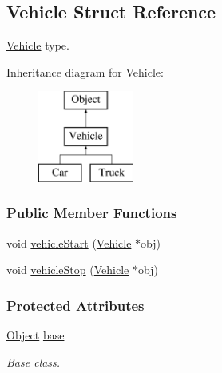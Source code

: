 \hypertarget{struct_vehicle}{}\subsection{Vehicle Struct Reference}
\label{struct_vehicle}


\mbox{\hyperlink{struct_vehicle}{Vehicle}} type.  


Inheritance diagram for Vehicle\+:\begin{figure}[H]
\begin{center}
\leavevmode
\includegraphics[height=3.000000cm]{struct_vehicle}
\end{center}
\end{figure}
\subsubsection*{Public Member Functions}
\begin{DoxyCompactItemize}
\item 
void \mbox{\hyperlink{struct_vehicle_a6891d3d28853bc3fdd075596dc6de9f8}{vehicle\+Start}} (\mbox{\hyperlink{struct_vehicle}{Vehicle}} $\ast$obj)
\item 
void \mbox{\hyperlink{struct_vehicle_a4dcbcba43792dcd673a552b14479ab77}{vehicle\+Stop}} (\mbox{\hyperlink{struct_vehicle}{Vehicle}} $\ast$obj)
\end{DoxyCompactItemize}
\subsubsection*{Protected Attributes}
\begin{DoxyCompactItemize}
\item 
\mbox{\label{struct_vehicle_ad7970f528d429f6fc1725173e93a77c2}} 
\mbox{\hyperlink{struct_object}{Object}} \mbox{\hyperlink{struct_vehicle_ad7970f528d429f6fc1725173e93a77c2}{base}}
\begin{DoxyCompactList}\small\item\em Base class. \end{DoxyCompactList}\end{DoxyCompactItemize}


